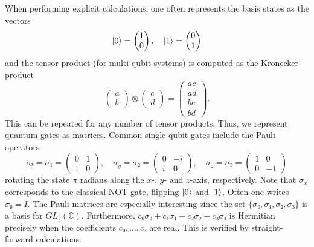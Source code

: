 When performing explicit calculations, one often represents the basis states as the vectors
\begin{equation}
  \lvert0\rangle = \begin{pmatrix} 1 \\ 0\end{pmatrix}, \quad \lvert1\rangle = \begin{pmatrix} 0 \\ 1 \end{pmatrix}
\end{equation}
and the tensor product (for multi-qubit systems) is computed as the Kronecker product
\begin{equation}
  \begin{pmatrix} a \\ b \end{pmatrix} \otimes \begin{pmatrix} c \\ d \end{pmatrix}
  = \begin{pmatrix} ac \\ ad \\ bc \\ bd \end{pmatrix}.
\end{equation}
This can be repeated for any number of tensor products. Thus, we represent quantum gates as matrices. Common single-qubit gates include the Pauli operators
\begin{equation}
  σₓ  = σ₁ = \begin{pmatrix} 0 & 1 \\ 1 & 0 \end{pmatrix}, \quad
  σ_y = σ₂ = \begin{pmatrix} 0 & -i \\ i & 0 \end{pmatrix}, \quad
  σ_z = σ₃ = \begin{pmatrix} 1 & 0 \\ 0 & -1 \end{pmatrix}
\end{equation}
rotating the state $\pi$ radians along the $x$-, $y$- and $z$-axis, respectively. Note that $\sigma_x$ corresponds to the classical NOT gate, flipping $\lvert0\rangle$ and $\lvert1\rangle$. Often one writes $σ₀ = I$. The Pauli matrices are especially interesting since the set $\{σ₀,σ₁,σ₂,σ₃\}$ is a basis for $GL₂(ℂ)$. Furthermore, $c₀σ₀ + c₁σ₁ + c₂σ₂ + c₃σ₃$ is Hermitian precisely when the coefficients $c₀,…,c₃$ are real. This is verified by straight-forward calculations.

